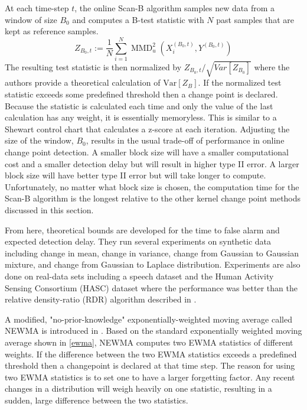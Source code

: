 At each time-step $t$, the online Scan-B algorithm samples new data from a window of size $B_0$ and computes a B-test statistic with $N$ past samples that are kept as reference samples. 
\begin{equation}
Z_{B_{0}, t}:=\frac{1}{N} \sum_{i=1}^{N} \operatorname{MMD}_{u}^{2}\left(X_{i}^{\left(B_{0}, t\right)}, Y^{\left(B_{0}, t\right)}\right)
\end{equation}
The resulting test statistic is then normalized by $Z_{B_{0}, t}/\sqrt{Var[Z_{B_0}]}$ where the authors provide a theoretical calculation of $\text{Var}[Z_B]$. If the normalized test statistic exceeds some predefined threshold then a change point is declared. Because the statistic is calculated each time and only the value of the last calculation has any weight,  it is essentially  memoryless. This is similar to a Shewart control chart that calculates a z-score at each iteration. Adjusting the size of the window, $B_0$, results in the usual trade-off of performance in online change point detection. A smaller block size will have a smaller computational cost and a smaller detection delay but will result in higher type II error. A larger block size will have better type II error but will take longer to compute. Unfortunately, no matter what block size is chosen, the computation time for the Scan-B algorithm is the longest relative to the other kernel change point methods discussed in this section. 

From here, theoretical bounds are developed for the time to false alarm and expected detection delay. They run several experiments on synthetic data including change in mean, change in variance, change from Gaussian to Gaussian mixture, and change from Gaussian to Laplace distribution. Experiments are also done on real-data sets including a speech dataset and the Human Activity Sensing Consortium (HASC) dataset where the performance was better than the relative density-ratio (RDR) algorithm described in \cite{liu2013change}.


A modified, "no-prior-knowledge" exponentially-weighted moving average called NEWMA is introduced in \cite{keriven2018newma}. Based on the standard exponentially weighted moving average shown in \ref{ewma}, NEWMA computes two EWMA statistics of different weights. If the difference between the two EWMA statistics exceeds a predefined threshold then a changepoint is declared at that time step. The reason for using two EWMA statistics is to set one to have a larger forgetting factor. Any recent changes in a distribution will weigh heavily on one statistic, resulting in a sudden, large difference between the two statistics. 

